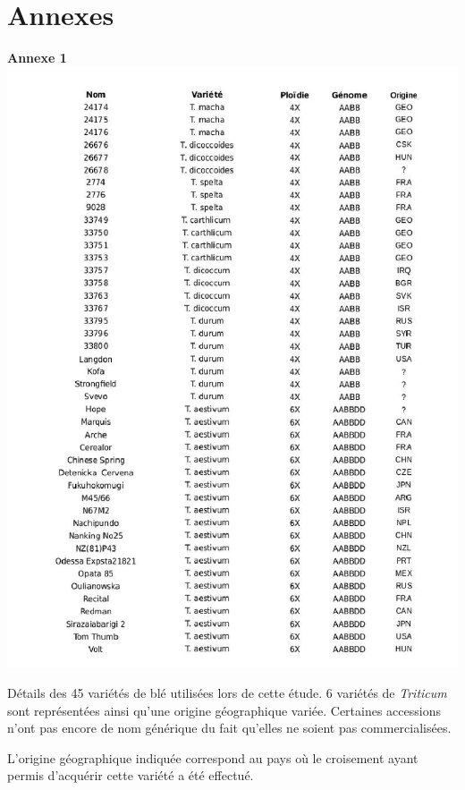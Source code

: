 \documentclass[a4paper, 12pt]{article}
\newcommand{\nocontentsline}[3]{}
\newcommand{\tocless}[2]{\bgroup\let\addcontentsline=\nocontentsline#1{#2}\egroup}
\begin{document}
\begin{onehalfspace}
\newpage
\pagestyle{empty}
~ \vfill \vspace{-1cm}
\tocless\part{Annexes}
\vfill

\newpage
\begin{center}
\Large\textbf{Annexe 1}\\
\includegraphics[scale=0.55]{pic_Data/ane1.jpg}\\
\end{center}

Détails des 45 variétés de blé utilisées lors de cette étude. 6 variétés de \textit{Triticum} sont représentées ainsi qu'une origine géographique variée. Certaines accessions n'ont pas encore de nom générique du fait qu'elles ne soient pas commercialisées.

L'origine géographique indiquée correspond au pays où le croisement ayant permis d'acquérir cette variété a été effectué.


\end{onehalfspace}
\end{document}
